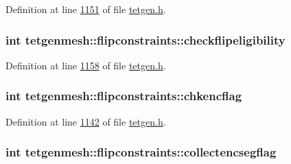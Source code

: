 Definition at line \hyperlink{tetgen_8h_source_l01151}{1151} of file \hyperlink{tetgen_8h_source}{tetgen.\+h}.

\subsubsection[{\texorpdfstring{checkflipeligibility}{checkflipeligibility}}]{\setlength{\rightskip}{0pt plus 5cm}int tetgenmesh\+::flipconstraints\+::checkflipeligibility}\hypertarget{classtetgenmesh_1_1flipconstraints_a4eb3f0e12749cae8b73f0f80e6f7748c}{}\label{classtetgenmesh_1_1flipconstraints_a4eb3f0e12749cae8b73f0f80e6f7748c}


Definition at line \hyperlink{tetgen_8h_source_l01158}{1158} of file \hyperlink{tetgen_8h_source}{tetgen.\+h}.

\subsubsection[{\texorpdfstring{chkencflag}{chkencflag}}]{\setlength{\rightskip}{0pt plus 5cm}int tetgenmesh\+::flipconstraints\+::chkencflag}\hypertarget{classtetgenmesh_1_1flipconstraints_a5cb16eed34f6726058a81ff226f138f7}{}\label{classtetgenmesh_1_1flipconstraints_a5cb16eed34f6726058a81ff226f138f7}


Definition at line \hyperlink{tetgen_8h_source_l01142}{1142} of file \hyperlink{tetgen_8h_source}{tetgen.\+h}.

\subsubsection[{\texorpdfstring{collectencsegflag}{collectencsegflag}}]{\setlength{\rightskip}{0pt plus 5cm}int tetgenmesh\+::flipconstraints\+::collectencsegflag}\hypertarget{classtetgenmesh_1_1flipconstraints_ae443417bfee2fe2d138ef19d1661668d}{}\label{classtetgenmesh_1_1flipconstraints_ae443417bfee2fe2d138ef19d1661668d}


